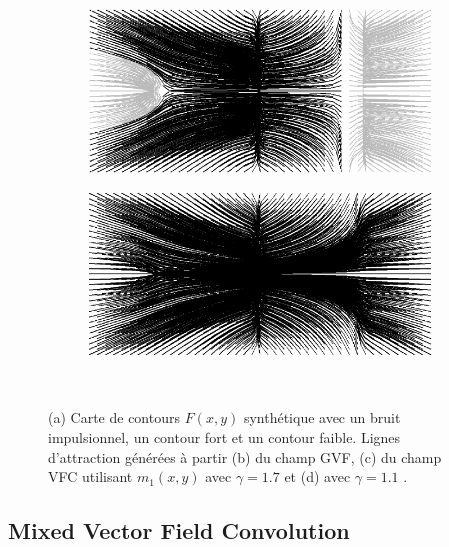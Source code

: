 \documentclass{article}
\begin{document}
\begin{figure}[!h]
   \begin{subfigure}[c]{.5\linewidth}
     \centering
     \includegraphics[scale=0.45]{synthetic_map_VFC_gamma017.png}
     \caption{}
   \end{subfigure}
   \begin{subfigure}[c]{.5\linewidth}
     \centering
     \includegraphics[scale=0.45]{synthetic_map_VFC_gamma011.png}
     \caption{}
   \end{subfigure}\\
   
   \caption{(a) Carte de contours $F(x,y)$ synthétique avec un bruit impulsionnel, un contour fort et un contour faible. Lignes d'attraction générées à partir (b) du champ GVF, (c) du champ VFC utilisant $m_1(x,y)$ avec $\gamma=1.7$ et (d) avec $\gamma = 1.1$ .}
   \label{fig:synthetic_map}
\end{figure}

\subsection{Mixed Vector Field Convolution}





\subsection{}
\end{document}
